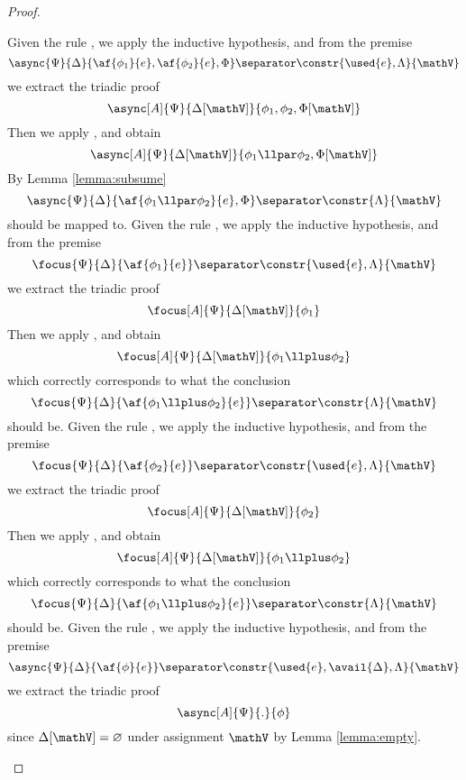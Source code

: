 \begin{proof}
\begin{itemize}
		\indCase{\displaypar} Given the rule \derRule{\displaypar}, we apply the inductive hypothesis, and from the premise
			$$ \async{\Psi}{\Delta}{\af{\phi_1}{e}, \af{\phi_2}{e}, \Phi} \separator \constr{\used{e}, \Lambda}{\mathV}$$
			we extract the triadic proof 
			$$\async[A]{\Psi}{\Delta[\mathV]}{\phi_1, \phi_2, \Phi[\mathV]} $$
			Then we apply \derRule[A]{\displaypar}, and obtain
			$$\async[A]{\Psi}{\Delta[\mathV]}{\phi_1 \llpar \phi_2, \Phi[\mathV]} $$
			By Lemma \ref{lemma:subsume} 
			$$ \async{\Psi}{\Delta}{\af{\phi_1 \llpar \phi_2}{e}, \Phi} \separator \constr{\Lambda}{\mathV} $$
			should be mapped to.
		\indCase{\displayplus[L]} Given the rule \derRule{\displayplus[L]}, we apply the inductive hypothesis, and from the premise
			$$ \focus{\Psi}{\Delta}{\af{\phi_1}{e}} \separator \constr{\used{e}, \Lambda}{\mathV}$$
			we extract the triadic proof
			$$ \focus[A]{\Psi}{\Delta[\mathV]}{\phi_1} $$
			Then we apply \derRule[A]{\displayplus[L]}, and obtain
			$$ \focus[A]{\Psi}{\Delta[\mathV]}{\phi_1 \llplus \phi_2} $$
			which correctly corresponds to what the conclusion
			$$ \focus{\Psi}{\Delta}{\af{\phi_1 \llplus \phi_2}{e}} \separator \constr{\Lambda}{\mathV} $$
			should be.
		\indCase{\displayplus[R]} Given the rule \derRule{\displayplus[R]}, we apply the inductive hypothesis, and from the premise
			$$ \focus{\Psi}{\Delta}{\af{\phi_2}{e}} \separator \constr{\used{e}, \Lambda}{\mathV}$$
			we extract the triadic proof
			$$ \focus[A]{\Psi}{\Delta[\mathV]}{\phi_2} $$
			Then we apply \derRule[A]{\displayplus[R]}, and obtain
			$$ \focus[A]{\Psi}{\Delta[\mathV]}{\phi_1 \llplus \phi_2} $$
			which correctly corresponds to what the conclusion
			$$ \focus{\Psi}{\Delta}{\af{\phi_1 \llplus \phi_2}{e}} \separator \constr{\Lambda}{\mathV} $$
			should be.
		\indCase{\displaybang} Given the rule \derRule{\displaybang}, we apply the inductive hypothesis, and from the premise
			$$ \async{\Psi}{\Delta}{\af{\phi}{e}} \separator \constr{\used{e}, \avail{\Delta}, \Lambda}{\mathV} $$
			we extract the triadic proof
			$$ \async[A]{\Psi}{.}{\phi} $$
			since $\Delta[\mathV] = \varnothing$ under assignment $\mathV$ by Lemma \ref{lemma:empty}.

\end{itemize}
\end{proof}
